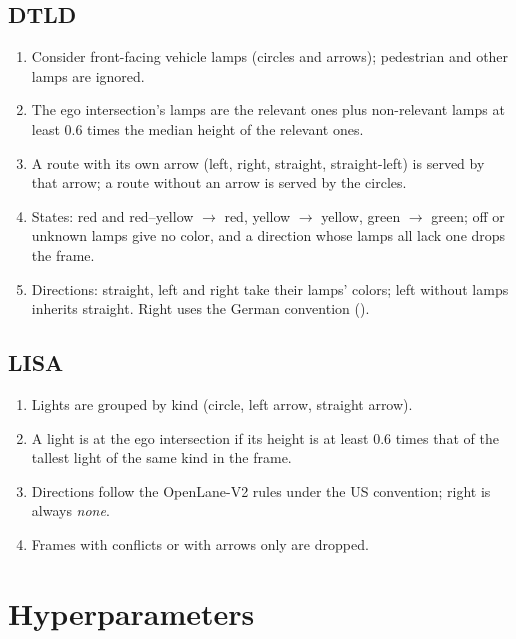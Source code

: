 \section{DTLD}

\begin{enumerate}
  \item Consider front-facing vehicle lamps (circles and arrows); pedestrian and other lamps are
        ignored.
  \item The ego intersection's lamps are the relevant ones plus non-relevant lamps at least 0.6 times
        the median height of the relevant ones.
  \item A route with its own arrow (left, right, straight, straight-left) is served by that arrow; a
        route without an arrow is served by the circles.
  \item States: red and red--yellow $\to$ red, yellow $\to$ yellow, green $\to$ green; off or unknown
        lamps give no color, and a direction whose lamps all lack one drops the frame.
  \item Directions: straight, left and right take their lamps' colors; left without lamps inherits
        straight. Right uses the German convention
        ().
\end{enumerate}

\section{LISA}

\begin{enumerate}
  \item Lights are grouped by kind (circle, left arrow, straight arrow).
  \item A light is at the ego intersection if its height is at least 0.6 times that of the tallest light
        of the same kind in the frame.
  \item Directions follow the OpenLane-V2 rules under the US convention; right is always \emph{none}.
  \item Frames with conflicts or with arrows only are dropped.
\end{enumerate}

\chapter{Hyperparameters}
\label{app:hparams}

